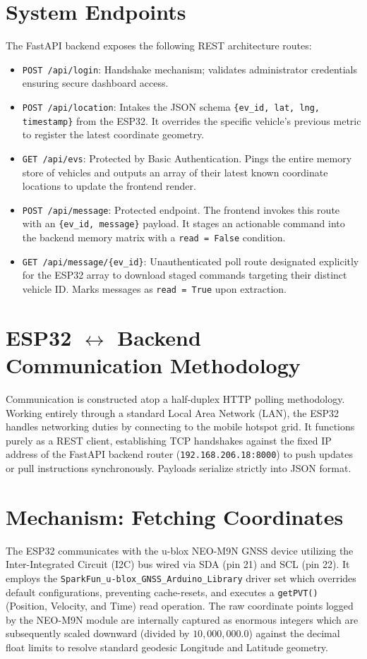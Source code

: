 \documentclass[a4paper,12pt]{article}
\begin{document}
\section{System Endpoints}
The FastAPI backend exposes the following REST architecture routes:
\begin{itemize}
    \item \texttt{POST /api/login}: Handshake mechanism; validates administrator credentials ensuring secure dashboard access.
    \item \texttt{POST /api/location}: Intakes the JSON schema \texttt{\{ev\_id, lat, lng, timestamp\}} from the ESP32. It overrides the specific vehicle's previous metric to register the latest coordinate geometry.
    \item \texttt{GET /api/evs}: Protected by Basic Authentication. Pings the entire memory store of vehicles and outputs an array of their latest known coordinate locations to update the frontend render.
    \item \texttt{POST /api/message}: Protected endpoint. The frontend invokes this route with an \texttt{\{ev\_id, message\}} payload. It stages an actionable command into the backend memory matrix with a \texttt{read = False} condition.
    \item \texttt{GET /api/message/\{ev\_id\}}: Unauthenticated poll route designated explicitly for the ESP32 array to download staged commands targeting their distinct vehicle ID. Marks messages as \texttt{read = True} upon extraction.
\end{itemize}

\section{ESP32 \(\leftrightarrow\) Backend Communication Methodology}
Communication is constructed atop a half-duplex HTTP polling methodology. Working entirely through a standard Local Area Network (LAN), the ESP32 handles networking duties by connecting to the mobile hotspot grid. It functions purely as a REST client, establishing TCP handshakes against the fixed IP address of the FastAPI backend router (\texttt{192.168.206.18:8000}) to push updates or pull instructions synchronously. Payloads serialize strictly into JSON format.

\section{Mechanism: Fetching Coordinates}
The ESP32 communicates with the u-blox NEO-M9N GNSS device utilizing the Inter-Integrated Circuit (I2C) bus wired via SDA (pin 21) and SCL (pin 22). It employs the \texttt{SparkFun\_u-blox\_GNSS\_Arduino\_Library} driver set which overrides default configurations, preventing cache-resets, and executes a \texttt{getPVT()} (Position, Velocity, and Time) read operation. The raw coordinate points logged by the NEO-M9N module are internally captured as enormous integers which are subsequently scaled downward (divided by $10,000,000.0$) against the decimal float limits to resolve standard geodesic Longitude and Latitude geometry.
\end{document}
